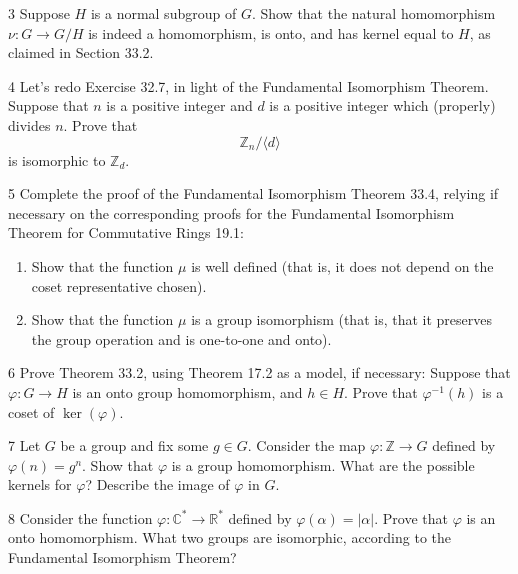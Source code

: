 \begin{problem}{3}
    Suppose $H$ is a normal subgroup of $G$. Show that the natural homomorphism
    $\nu : G \to G/H$ is indeed a homomorphism, is onto, and has kernel equal to $H$, as
    claimed in Section 33.2.
\end{problem}
\unsolved

\begin{problem}{4}
    Let's redo Exercise 32.7, in light of the Fundamental Isomorphism Theorem. Suppose that
    $n$ is a positive integer and $d$ is a positive integer which (properly) divides $n$.
    Prove that
    \[\mathbb{Z}_n/\langle d \rangle\]
    is isomorphic to $\mathbb{Z}_d$.
\end{problem}
\unsolved

\begin{problem}{5}
    Complete the proof of the Fundamental Isomorphism Theorem 33.4, relying if necessary on
    the corresponding proofs for the Fundamental Isomorphism Theorem for Commutative
    Rings 19.1:
    \begin{enumerate}
        \item[(a)] Show that the function $\mu$ is well defined (that is, it does not depend
        on the coset representative chosen).
        \item[(b)] Show that the function $\mu$ is a group isomorphism (that is, that it
        preserves the group operation and is one-to-one and onto).
    \end{enumerate}
\end{problem}
\unsolved

\begin{problem}{6}
    Prove Theorem 33.2, using Theorem 17.2 as a model, if necessary: Suppose that
    $\varphi : G \to H$ is an onto group homomorphism, and $h \in H$. Prove that
    $\varphi^{-1}(h)$ is a coset of $\ker(\varphi)$.
\end{problem}
\unsolved

\begin{problem}{7}
    Let $G$ be a group and fix some $g \in G$. Consider the map $\varphi : \mathbb{Z} \to G$
    defined by $\varphi(n) = g^n$. Show that $\varphi$ is a group homomorphism. What are the
    possible kernels for $\varphi$? Describe the image of $\varphi$ in $G$.
\end{problem}
\unsolved

\begin{problem}{8}
    Consider the function $\varphi : \mathbb{C}^* \to \mathbb{R}^*$ defined by
    $\varphi(\alpha) = |\alpha|$. Prove that $\varphi$ is an onto homomorphism. What two
    groups are isomorphic, according to the Fundamental Isomorphism Theorem?
\end{problem}
\unsolved


